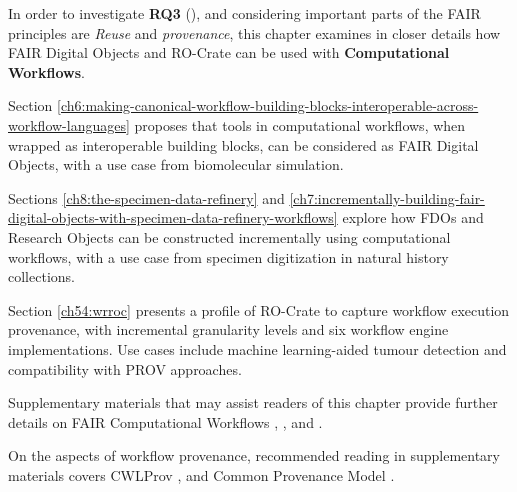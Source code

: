 In order to investigate \textbf{RQ3} (), and considering important parts of the FAIR principles are \emph{Reuse} and \emph{provenance}, this chapter examines in closer details how FAIR Digital Objects and RO-Crate can be used with \textbf{Computational Workflows}. 

Section \vref{ch6:making-canonical-workflow-building-blocks-interoperable-across-workflow-languages} proposes that tools in computational workflows, when wrapped as interoperable building blocks, can be considered as FAIR Digital Objects, with a use case from biomolecular simulation.

Sections \vref{ch8:the-specimen-data-refinery} and \vref{ch7:incrementally-building-fair-digital-objects-with-specimen-data-refinery-workflows} explore how FDOs and Research Objects can be constructed incrementally using computational workflows, with a use case from specimen digitization in natural history collections.

Section \vref{ch54:wrroc} presents a profile of RO-Crate to capture workflow execution provenance, with incremental granularity levels and six workflow engine implementations. Use cases include machine learning-aided tumour detection and compatibility with PROV approaches. 

Supplementary materials that may assist readers of this chapter provide further details on FAIR Computational Workflows \cite{Goble 2020},  \cite{Goble 2021},  \cite{Crusoe 2022} and  \cite{Brack 2022a}. 

On the aspects of workflow provenance, recommended reading in supplementary materials covers CWLProv \cite{Khan 2019},  \cite{De Geest 2022} and Common Provenance Model \cite{Wittner 2020,Wittner 2023a}.
